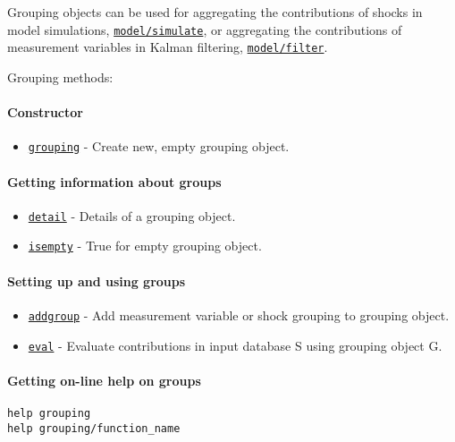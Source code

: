 

	Grouping objects can be used for aggregating the contributions of shocks
in model simulations, \href{model/simulate}{\texttt{model/simulate}}, or
aggregating the contributions of measurement variables in Kalman
filtering, \href{model/filter}{\texttt{model/filter}}.

Grouping methods:

\paragraph{Constructor}

\begin{itemize}
\itemsep1pt\parskip0pt
\item
  \href{grouping/grouping}{\texttt{grouping}} - Create new, empty
  grouping object.
\end{itemize}

\paragraph{Getting information about
groups}

\begin{itemize}
\itemsep1pt\parskip0pt
\item
  \href{grouping/detail}{\texttt{detail}} - Details of a grouping
  object.
\item
  \href{grouping/isempty}{\texttt{isempty}} - True for empty grouping
  object.
\end{itemize}

\paragraph{Setting up and using
groups}

\begin{itemize}
\itemsep1pt\parskip0pt
\item
  \href{grouping/addgroup}{\texttt{addgroup}} - Add measurement variable
  or shock grouping to grouping object.
\item
  \href{grouping/eval}{\texttt{eval}} - Evaluate contributions in input
  database S using grouping object G.
\end{itemize}

\paragraph{Getting on-line help on
groups}

\begin{verbatim}
help grouping
help grouping/function_name
\end{verbatim}



